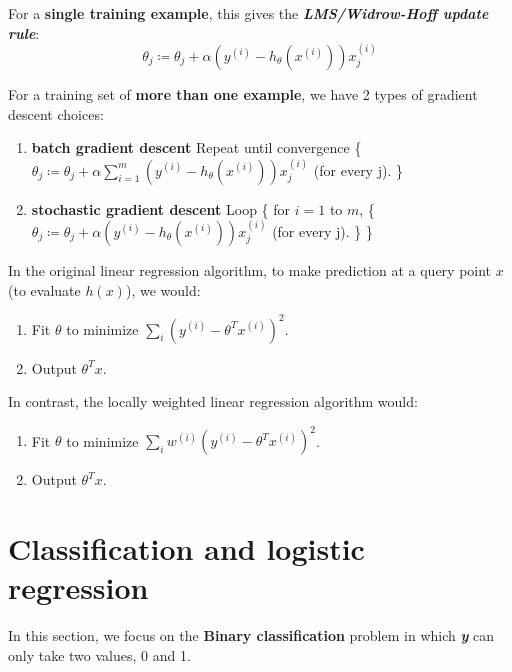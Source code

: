 \documentclass{article}
\begin{document}
For a \textbf{single training example}, this gives the \emph{\textbf{LMS/Widrow-Hoff update rule}}:
\begin{equation*}
\theta_j\coloneqq\theta_j+\alpha(y^{(i)}-h_\theta(x^{(i)}))x_j^{(i)}
\end{equation*}

For a training set of \textbf{more than one example}, we have 2 types of gradient descent choices:
\begin{enumerate}
    \item \textbf{batch gradient descent}
        \newline Repeat until convergence \{
        \newline $\theta_j\coloneqq\theta_j+\alpha\sum\limits_{i=1}^m(y^{(i)}-h_\theta(x^{(i)}))x_j^{(i)}$ (for every j).
        \newline \}
    \item \textbf{stochastic gradient descent}
        \newline Loop \{
        \newline \hspace*{1cm} for $i=1$ to $m$, \{
        \newline \hspace*{1cm} \hspace{1cm}$\theta_j\coloneqq\theta_j+\alpha(y^{(i)}-h_\theta(x^{(i)}))x_j^{(i)}$ (for every j).
        \newline \hspace*{1cm}\}
        \newline \}
\end{enumerate}

In the original linear regression algorithm, to make prediction at a query point $x$ (to evaluate $h(x)$), we would:
\begin{enumerate}
    \item Fit $\theta$ to minimize $\sum\limits_i(y^{(i)}-\theta^Tx^{(i)})^2$.
    \item Output $\theta^Tx$.
\end{enumerate}
In contrast, the locally weighted linear regression algorithm would:
\begin{enumerate}
    \item Fit $\theta$ to minimize $\sum\limits_iw^{(i)}(y^{(i)}-\theta^Tx^{(i)})^2$.
    \item Output $\theta^Tx$.
\end{enumerate}

\section{Classification and logistic regression}
In this section, we focus on the \textbf{Binary classification} problem in which \emph{\textbf{y}} can only take two values, 0 and 1.
\end{document}

